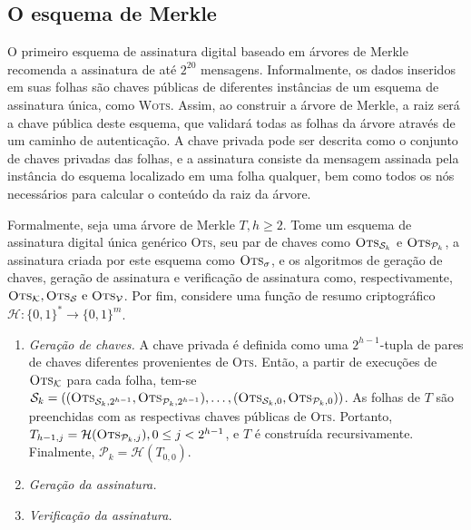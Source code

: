\documentclass[12pt]{report}
\newcommand{\pk}{$\mathcal{P}_k$}
\newcommand{\sk}{$\mathcal{S}_k$}
\newcommand{\binwds}[1]{\{0, 1\}^{#1}}
\begin{document}
\subsection{O esquema de Merkle}

O primeiro esquema de assinatura digital baseado em árvores de Merkle \cite{Merkle:1989:CDS:118209.118230} recomenda a assinatura de até $2^{20}$ mensagens. Informalmente, os dados inseridos em suas folhas são chaves públicas de diferentes instâncias de um esquema de assinatura única, como \textsc{Wots}. Assim, ao construir a árvore de Merkle, a raiz será a chave pública deste esquema, que validará todas as folhas da árvore através de um caminho de autenticação. A chave privada pode ser descrita como o conjunto de chaves privadas das folhas, e a assinatura consiste da mensagem assinada pela instância do esquema localizado em uma folha qualquer, bem como todos os nós necessários para calcular o conteúdo da raiz da árvore.

Formalmente, seja uma árvore de Merkle $T, h \geq 2$. Tome um esquema de assinatura digital única genérico \textsc{Ots}, seu par de chaves como $\textsc{Ots}_\text{\sk{}}$ e $\textsc{Ots}_\text{\pk{}}$, a assinatura criada por este esquema como $\textsc{Ots}_\sigma$, e os algoritmos de geração de chaves, geração de assinatura e verificação de assinatura como, respectivamente, $\textsc{Ots}_\mathcal{K}, \textsc{Ots}_\mathcal{S} \text{ e } \textsc{Ots}_\mathcal{V}$. Por fim, considere uma função de resumo criptográfico $\mathcal{H} : \binwds{*} \longrightarrow \binwds{m}$.

\begin{enumerate}

    \item[] \emph{Geração de chaves.} A chave privada é definida como uma $2^{h - 1}$-tupla
    de pares de chaves diferentes provenientes de \textsc{Ots}. Então, a partir de execuções de $\textsc{Ots}_\mathcal{K}$ para cada folha, tem-se $\text{\sk{}} = ((\textsc{Ots}_{\text{\sk{}}, 2^{h - 1}}, \textsc{Ots}_{\text{\pk{}}, 2^{h - 1}}), \dots, (\textsc{Ots}_{\text{\sk{}}, 0}, \textsc{Ots}_{\text{\pk{}}, 0}))$. As folhas de $T$ são preenchidas com as respectivas chaves públicas de \textsc{Ots}. Portanto, $T_{h - 1, j} = \mathcal{H}(\textsc{Ots}_{\text{\pk{}}, j}), 0 \leq j < 2^{h - 1}$, e $T$ é construída recursivamente. Finalmente, $\text{\pk{}} = \mathcal{H}(T_{0,0})$.
    
    \item[] \emph{Geração da assinatura.}
    
    \item[] \emph{Verificação da assinatura.} 

\end{enumerate}



\end{document}
